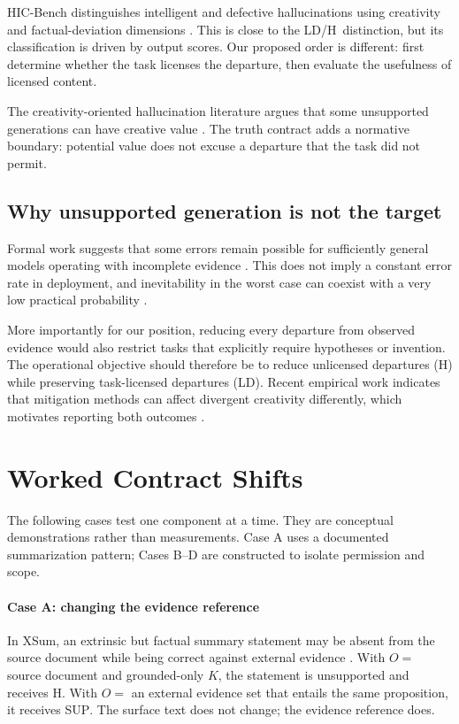 \documentclass{clv2025}
\newcommand{\LD}{\textsc{LD}}
\newcommand{\Hall}{\textsc{H}}
\newcommand{\SUP}{\textsc{SUP}}
\begin{document}
HIC-Bench distinguishes intelligent and defective hallucinations using creativity and factual-deviation dimensions \citep{yang_hicbench_2025}.
This is close to the \LD/\Hall\ distinction, but its classification is driven by output scores.
Our proposed order is different: first determine whether the task licenses the departure, then evaluate the usefulness of licensed content.

The creativity-oriented hallucination literature argues that some unsupported generations can have creative value \citep{jiang_survey_2024,sun_hallucinating_2024,sui_confabulation_2024}.
The truth contract adds a normative boundary: potential value does not excuse a departure that the task did not permit.

\subsection{Why unsupported generation is not the target}

Formal work suggests that some errors remain possible for sufficiently general models operating with incomplete evidence \citep{kalai_calibrated_2024,xu_hallucination_2024,banerjee_llms_2024}.
This does not imply a constant error rate in deployment, and inevitability in the worst case can coexist with a very low practical probability \citep{suzuki_negligible_2025}.

More importantly for our position, reducing every departure from observed evidence would also restrict tasks that explicitly require hypotheses or invention.
The operational objective should therefore be to reduce unlicensed departures (\Hall) while preserving task-licensed departures (\LD).
Recent empirical work indicates that mitigation methods can affect divergent creativity differently, which motivates reporting both outcomes \citep{banerjee_does_2025,sun_hallucinating_2024}.

\section{Worked Contract Shifts}\label{sec:cases}

The following cases test one component at a time.
They are conceptual demonstrations rather than measurements.
Case A uses a documented summarization pattern; Cases B--D are constructed to isolate permission and scope.

\paragraph{Case A: changing the evidence reference}
In XSum, an extrinsic but factual summary statement may be absent from the source document while being correct against external evidence \citep{maynez_faithfulness_2020}.
With $O=$ source document and grounded-only $K$, the statement is unsupported and receives \Hall.
With $O=$ an external evidence set that entails the same proposition, it receives \SUP.
The surface text does not change; the evidence reference does.
\end{document}
